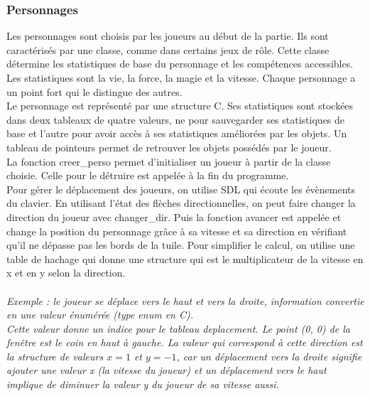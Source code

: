 \documentclass[11pt]{article}
\begin{document}
            \subsubsection{Personnages}
            Les personnages sont choisis par les joueurs au début de la partie. Ils sont caractérisés par une classe, comme dans certains jeux de rôle. 
            Cette classe détermine les statistiques de base du personnage et les compétences accessibles. Les statistiques sont la vie, la force, la magie et la vitesse. 
            Chaque personnage a un point fort qui le distingue des autres.\\
            Le personnage est représenté par une structure C. Ses statistiques sont stockées dans deux tableaux de quatre valeurs, 
            ne pour sauvegarder ses statistiques de base et l'autre pour avoir accès à ses statistiques améliorées par les objets. 
            Un tableau de pointeurs permet de retrouver les objets possédés par le joueur.\\
            La fonction creer\_perso permet d’initialiser un joueur à partir de la classe choisie.
            Celle pour le détruire est appelée à la fin du programme.\\
            Pour gérer le déplacement des joueurs, on utilise SDL qui écoute les évènements du clavier. 
            En utilisant l’état des flèches directionnelles, on peut faire changer la direction du joueur avec changer\_dir. 
            Puis la fonction avancer est appelée et change la position du personnage grâce à sa vitesse et sa direction en vérifiant qu’il ne dépasse pas les bords de la tuile. 
            Pour simplifier le calcul, on utilise une table de hachage qui donne une structure qui est le multiplicateur de la vitesse en x et en y selon la direction. \\\\
            \textit{
                Exemple : le joueur se déplace vers le haut et vers la droite, information convertie en une valeur énumérée (type enum en C). \\
                Cette valeur donne un indice pour le tableau deplacement. Le point (0, 0) de la fenêtre est le coin en haut à gauche. La valeur qui correspond à cette direction est la structure de valeurs $x=1$ et $y=-1$, 
                car un déplacement vers la droite signifie ajouter une valeur x (la vitesse du joueur) 
                et un déplacement vers le haut implique de diminuer la valeur y du joueur de sa vitesse aussi.
            }
\end{document}
